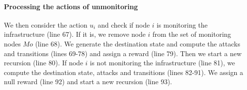 \paragraph{Processing the actions of unmonitoring}
We then consider the action $u_i$ and check if node $i$ is monitoring the infrastructure (line 67). 
If it is, we remove node $i$ from the set of monitoring nodes $Mo$ (line 68).
We generate the destination state and compute the attacks and transitions (lines 69-78) and assign a reward (line 79).
Then we start a new recursion (line 80).
If node $i$ is not monitoring the infrastructure (line 81), we compute the destination state, attacks and transitions (lines 82-91).
We assign a null reward (line 92) and start a new recursion (line 93).
\vspace{-50pt}

